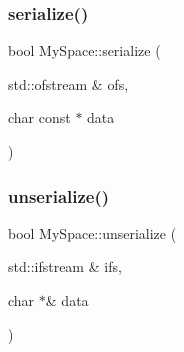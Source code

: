 \subsubsection{\texorpdfstring{serialize()}{serialize()}}
{\footnotesize\ttfamily bool My\+Space\+::serialize (\begin{DoxyParamCaption}\item[{std\+::ofstream \&}]{ofs,  }\item[{char const $\ast$}]{data }\end{DoxyParamCaption})}

\mbox{\label{namespaceMySpace_a99c49bdb6efc496c35e1e3ca0167da2b}} 
\subsubsection{\texorpdfstring{unserialize()}{unserialize()}}
{\footnotesize\ttfamily bool My\+Space\+::unserialize (\begin{DoxyParamCaption}\item[{std\+::ifstream \&}]{ifs,  }\item[{char $\ast$\&}]{data }\end{DoxyParamCaption})}

